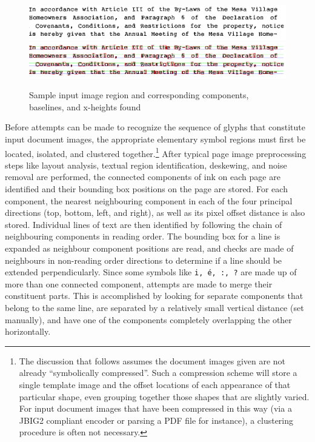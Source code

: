 \documentclass[times, 10pt,twocolumn]{article}
\begin{document}
\begin{figure}[ht]
  \centering
  \includegraphics[scale=.9]{figures/input_lines}
  \includegraphics[scale=.9]{figures/line_comps}
  \caption{Sample input image region and corresponding components, baselines,
           and x-heights found}
  \label{inimg_fig}
\end{figure}

\label{clustering_sec}

Before attempts can be made to recognize the sequence of glyphs that 
constitute input document images, the appropriate elementary symbol regions 
must first be located, isolated, and clustered together.\footnote{The
discussion that follows assumes the document images given are not
already ``symbolically compressed''. Such a compression scheme will
store a single template image and the offset locations of each
appearance of that particular shape, even grouping together
those shapes that are slightly varied.  For input document images that
have been compressed in this way (via a JBIG2 compliant encoder 
or parsing a PDF file for instance), a clustering procedure is often not necessary.}
After typical page image preprocessing steps like layout analysis, textual
region identification, deskewing, and noise removal are performed, the
connected components of ink on each page are identified and their bounding box
positions on the page are stored.  For each component, the nearest neighbouring
component in each of the four principal directions (top, bottom, left, and
right), as well as its pixel offset distance is also stored.  Individual lines
of text are then identified by following the chain of neighbouring components in
reading order.  The bounding box for a line is expanded as neighbour
component positions are read, and checks are made of neighbours in non-reading
order directions to determine if a line should be extended perpendicularly.
%
Since some symbols like {\tt i, \'{e}, :, ?} are made up of more than one
connected component, attempts are made to merge their constituent parts.  This
is accomplished by looking for separate components that belong to the same
line, are separated by a relatively small vertical distance (set manually), and
have one of the components completely overlapping the other horizontally.
\end{document}
